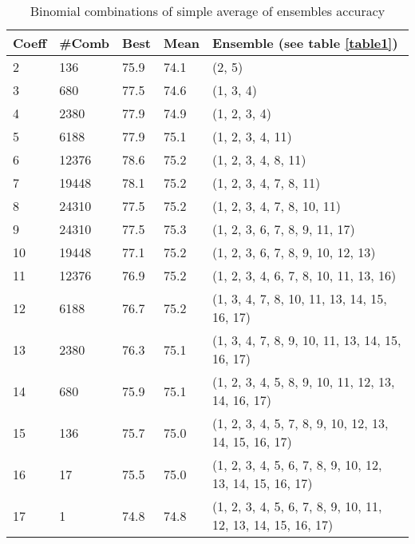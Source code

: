 \documentclass[10pt,letterpaper]{article}
\begin{document}
\begin{center}
\begin{table}[hbt!]
\caption{Binomial combinations of simple average of ensembles accuracy}
\begin{tabular}{ |l|l|l|l|l| }
\hline
Coeff & \#Comb & Best & Mean & Ensemble (see table \ref{table1}) \\ \hline
2 & 136 &    75.9 & 74.1 & (2, 5) \\ \hline
3 & 680 &    77.5 & 74.6 & (1, 3, 4) \\ \hline
4 & 2380 &   77.9 & 74.9 & (1, 2, 3, 4) \\ \hline
5 & 6188 &   77.9 & 75.1 & (1, 2, 3, 4, 11) \\ \hline
6 & 12376 &  78.6 & 75.2 & (1, 2, 3, 4, 8, 11) \\ \hline
7 & 19448 &  78.1 & 75.2 & (1, 2, 3, 4, 7, 8, 11) \\ \hline
8 & 24310 &  77.5 & 75.2 & (1, 2, 3, 4, 7, 8, 10, 11) \\ \hline
9 & 24310 &  77.5 & 75.3 & (1, 2, 3, 6, 7, 8, 9, 11, 17) \\ \hline
10 & 19448 & 77.1 & 75.2 & (1, 2, 3, 6, 7, 8, 9, 10, 12, 13) \\ \hline
11 & 12376 & 76.9 & 75.2 & (1, 2, 3, 4, 6, 7, 8, 10, 11, 13, 16) \\ \hline
12 & 6188 &  76.7 & 75.2 & (1, 3, 4, 7, 8, 10, 11, 13, 14, 15, 16, 17) \\ \hline
13 & 2380 &  76.3 & 75.1 & (1, 3, 4, 7, 8, 9, 10, 11, 13, 14, 15, 16, 17) \\ \hline
14 & 680 &   75.9 & 75.1 & (1, 2, 3, 4, 5, 8, 9, 10, 11, 12, 13, 14, 16, 17) \\ \hline
15 & 136 &   75.7 & 75.0 & (1, 2, 3, 4, 5, 7, 8, 9, 10, 12, 13, 14, 15, 16, 17) \\ \hline
16 & 17 &    75.5 & 75.0 & (1, 2, 3, 4, 5, 6, 7, 8, 9, 10, 12, 13, 14, 15, 16, 17) \\ \hline
17 & 1 &     74.8 & 74.8 & (1, 2, 3, 4, 5, 6, 7, 8, 9, 10, 11, 12, 13, 14, 15, 16, 17) \\ \hline
\end{tabular}
\label{table6}
\end{table}
\end{center}
\end{document}
